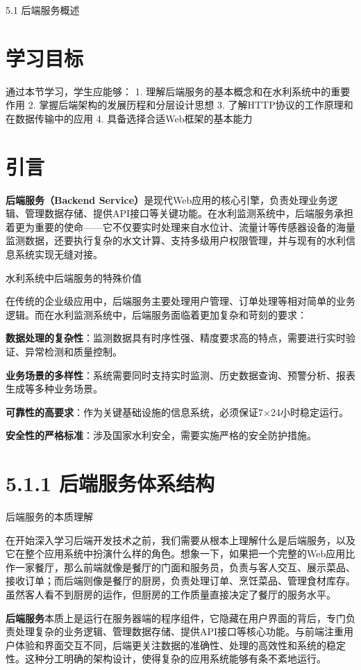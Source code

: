  5.1 后端服务概述

\section{学习目标}

通过本节学习，学生应能够： 1. 理解后端服务的基本概念和在水利系统中的重要作用 2. 掌握后端架构的发展历程和分层设计思想 3. 了解HTTP协议的工作原理和在数据传输中的应用 4. 具备选择合适Web框架的基本能力

\section{引言}

\textbf{后端服务（Backend Service）}是现代Web应用的核心引擎，负责处理业务逻辑、管理数据存储、提供API接口等关键功能。在水利监测系统中，后端服务承担着更为重要的使命------它不仅要实时处理来自水位计、流量计等传感器设备的海量监测数据，还要执行复杂的水文计算、支持多级用户权限管理，并与现有的水利信息系统实现无缝对接。

 水利系统中后端服务的特殊价值

在传统的企业级应用中，后端服务主要处理用户管理、订单处理等相对简单的业务逻辑。而在水利监测系统中，后端服务面临着更加复杂和苛刻的要求：

\textbf{数据处理的复杂性}：监测数据具有时序性强、精度要求高的特点，需要进行实时验证、异常检测和质量控制。

\textbf{业务场景的多样性}：系统需要同时支持实时监测、历史数据查询、预警分析、报表生成等多种业务场景。

\textbf{可靠性的高要求}：作为关键基础设施的信息系统，必须保证7×24小时稳定运行。

\textbf{安全性的严格标准}：涉及国家水利安全，需要实施严格的安全防护措施。

\section{5.1.1 后端服务体系结构}

 后端服务的本质理解

在开始深入学习后端开发技术之前，我们需要从根本上理解什么是后端服务，以及它在整个应用系统中扮演什么样的角色。想象一下，如果把一个完整的Web应用比作一家餐厅，那么前端就像是餐厅的门面和服务员，负责与客人交互、展示菜品、接收订单；而后端则像是餐厅的厨房，负责处理订单、烹饪菜品、管理食材库存。虽然客人看不到厨房的运作，但厨房的工作质量直接决定了餐厅的服务水平。

\textbf{后端服务}本质上是运行在服务器端的程序组件，它隐藏在用户界面的背后，专门负责处理复杂的业务逻辑、管理数据存储、提供API接口等核心功能。与前端注重用户体验和界面交互不同，后端更关注数据的准确性、处理的高效性和系统的稳定性。这种分工明确的架构设计，使得复杂的应用系统能够有条不紊地运行。

